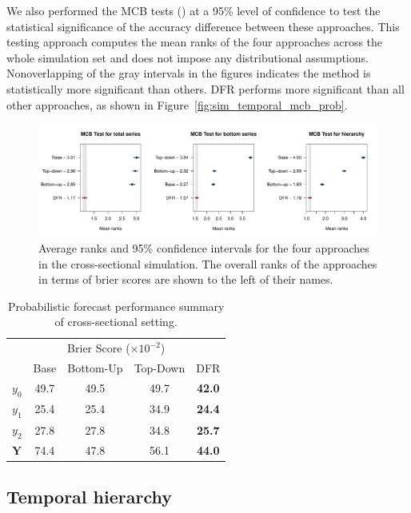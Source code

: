 \documentclass[a4paper,review,12pt,authoryear]{elsarticle}
\newcommand{\bY}{\mathbf{Y}}
\begin{document}
We also performed the MCB tests (\citealp{koningM3CompetitionStatistical2005}) at a 95\% level of confidence to test the statistical significance of the accuracy difference between these approaches. 
This testing approach computes the mean ranks of the four approaches across the whole simulation set and does not impose any distributional assumptions.
Nonoverlapping of the gray intervals in the figures indicates the method is statistically more significant than others.
DFR performs more significant than all other approaches, as shown in Figure~\ref{fig:sim_temporal_mcb_prob}.



\begin{figure}
  \centering
  \label{fig:mcb_crosssectional}
  \caption{Average ranks and 95\% confidence intervals for the four approaches in the cross-sectional simulation. The overall ranks of the approaches in terms of brier scores are shown to the left of their names.}
  \includegraphics[width=\textwidth]{figures/cross_sectional_mcb.pdf}
\end{figure}


\begin{table}
  \centering
  \caption{\label{tab:sim_crosssectional_res_dist} Probabilistic forecast performance summary of cross-sectional setting.}
  \begin{tabular}{lcccc}
  \toprule
  \multicolumn{5}{c}{Brier Score ($\times 10^{-2}$)}\\ 
   & Base & Bottom-Up & Top-Down & DFR \\\midrule
  $y_0$ & 49.7 & 49.5 & 49.7 & \textbf{42.0} \\
  $y_1$ & 25.4 & 25.4 & 34.9 & \textbf{24.4} \\
  $y_2$ & 27.8 & 27.8 & 34.8 & \textbf{25.7}\\
  $\bY$ & 74.4 & 47.8 & 56.1 & \textbf{44.0} \\
  \bottomrule
  \end{tabular} 
\end{table}


\subsection{Temporal hierarchy}
\end{document}
